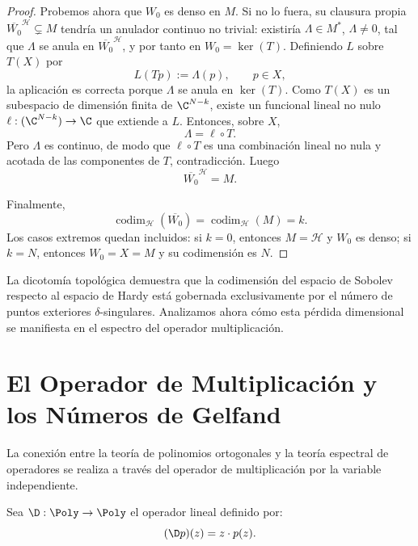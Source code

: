 \begin{proof}
	Probemos ahora que $W_0$ es denso en $M$. Si no lo fuera, su clausura propia $\overline{W_0}^{\mathcal H}\subsetneq M$ tendría un anulador continuo no trivial: existiría $\Lambda\in M^*$, $\Lambda\neq 0$, tal que $\Lambda$ se anula en $\overline{W_0}^{\mathcal H}$, y por tanto en $W_0=\ker(T)$. Definiendo $L$ sobre $T(X)$ por
	\[
		L(Tp):=\Lambda(p),\qquad p\in X,
	\]
	la aplicación es correcta porque $\Lambda$ se anula en $\ker(T)$. Como $T(X)$ es un subespacio de dimensión finita de $\C^{N-k}$, existe un funcional lineal no nulo $\ell:(\C^{N-k})\to\C$ que extiende a $L$. Entonces, sobre $X$,
	\[
		\Lambda=\ell\circ T.
	\]
	Pero $\Lambda$ es continuo, de modo que $\ell\circ T$ es una combinación lineal no nula y acotada de las componentes de $T$, contradicción. Luego
	\[
		\overline{W_0}^{\mathcal H}=M.
	\]

	Finalmente,
	\[
		\operatorname{codim}_{\mathcal H}(\overline{W_0})
		=
		\operatorname{codim}_{\mathcal H}(M)
		=
		k.
	\]
	Los casos extremos quedan incluidos: si $k=0$, entonces $M=\mathcal H$ y $W_0$ es denso; si $k=N$, entonces $W_0=X=M$ y su codimensión es $N$.
\end{proof}

La dicotomía topológica demuestra que la codimensión del espacio de Sobolev respecto al espacio de Hardy está gobernada exclusivamente por el número de puntos exteriores $\delta$-singulares. Analizamos ahora cómo esta pérdida dimensional se manifiesta en el espectro del operador multiplicación.

\section{El Operador de Multiplicación y los Números de Gelfand}

La conexión entre la teoría de polinomios ortogonales y la teoría espectral de operadores se realiza a través del operador de multiplicación por la variable independiente.

\begin{defn} \label{def:operador_multiplicacion}
	Sea $\D: \Poly \to \Poly$ el operador lineal definido por:
	\begin{equation}
		(\D p)(z) = z \cdot p(z).
	\end{equation}
\end{defn}

